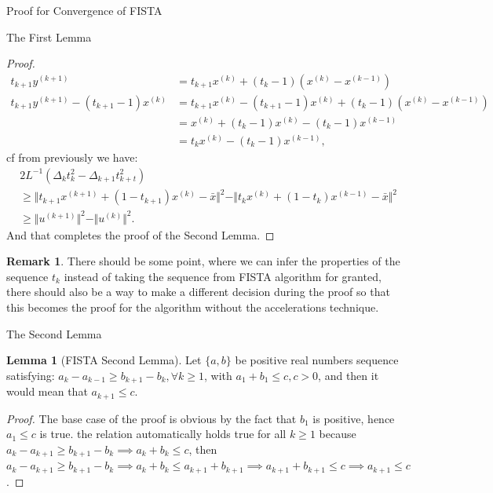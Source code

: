 \documentclass[]{article}
\theoremstyle{definition}
\newtheorem{lemma}{Lemma}[subsection]  %
\newtheorem{remark}{Remark}[subsection]
{
    \newtheorem{assumption}{Assumption}
}
\begin{document}
\begin{section}{Proof for Convergence of FISTA}
\begin{subsection}{The First Lemma}
\begin{proof}
\begin{align*}
                t_{k + 1}y^{(k + 1)} &= t_{k + 1}x^{(k)} + (t_k - 1)(x^{(k)} - x^{(k - 1)})
                \\
                t_{k + 1}y^{(k + 1)} - (t_{k + 1}- 1)x^{(k)}
                &= t_{k + 1}x^{(k)} - (t_{k + 1}- 1)x^{(k)} + (t_k - 1)(x^{(k)} - x^{(k - 1)})
                \\
                &= 
                x^{(k)} + (t_k - 1)x^{(k)} - (t_k - 1)x^{(k - 1)}
                \\
                &= t_kx^{(k)} - (t_k - 1)x^{(k - 1)}, 
            \end{align*}
            cf from previously we have: 
            \begin{align*}
                & 2L^{-1}(\Delta_k t_k^2 - \Delta_{k + 1}t_{k + t}^2)
                \\
                &\ge 
                \Vert 
                    t_{k + 1}x^{(k + 1)}
                    + 
                    (1 - t_{k + 1}) x^{(k)} - \bar x
                \Vert^2
                - 
                \Vert t_kx^{(k)} + (1 - t_k)x^{(k -1)} - \bar x\Vert^2
                \\
                & \ge \Vert u^{(k + 1)}\Vert^2 - \Vert u^{(k)}\Vert^2.
            \end{align*}
            And that completes the proof of the Second Lemma. 
        \end{proof}
        \begin{remark}
            There should be some point, where we can infer the properties of the sequence $t_k$ instead of taking the sequence from FISTA algorithm for granted, there should also be a way to make a different decision during the proof so that this becomes the proof for the algorithm without the accelerations technique. 
        \end{remark}
    \end{subsection}

    \begin{subsection}{The Second Lemma}
        \begin{lemma}[FISTA Second Lemma]
            Let $\{a, b\}$ be positive real numbers sequence satisfying: $a_k - a_{k - 1}\ge b_{k + 1} - b_k, \forall k \ge 1$, with $a_1 + b_1 \le c, c > 0$, and then it would mean that $a_{k + 1}\le c$. 
        \end{lemma}
        \begin{proof}
            The base case of the proof is obvious by the fact that $b_1$ is positive, hence $a_1 \le c$ is true. the relation automatically holds true for all $k\ge 1$ because $a_k - a_{k + 1}\ge b_{k + 1} - b_k \implies a_k + b_k \le c$, then $a_k - a_{k + 1}\ge b_{k + 1} - b_k \implies a_k + b_k \le a_{k + 1} + b_{k + 1} \implies a_{k + 1} + b_{k + 1} \le c\implies a_{k + 1}\le c$. 
        \end{proof}
    \end{subsection}


\end{section}
\end{document}
